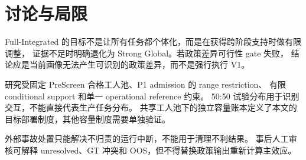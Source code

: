 \section{讨论与局限}

Full-Integrated 的目标不是让所有任务都个体化，而是在获得跨阶段支持时做有限调整，
证据不足时明确退化为 Strong Global。若政策差异可行性 gate 失败，
结论应是当前画像无法产生可识别的政策差异，而不是强行执行 V1。

研究受固定 PreScreen 合格工人池、P1 admission 的 range restriction、
有限 conditional support 和单一 operational reference 约束。
50:50 试验分布用于识别交互，不能直接代表生产任务分布。
共享工人池下的独立容量账本定义了本文的目标部署制度，其他容量制度需要单独验证。

外部事故处置只能解决不归责的运行中断，不能用于清理不利结果。
事后人工审核可解释 unresolved、GT 冲突和 OOS，但不得替换政策输出重新计算主效应。

